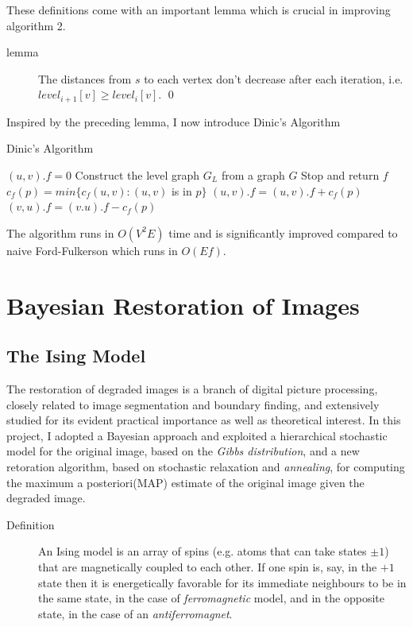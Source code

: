 \documentclass[openany]{memoir}
\begin{document}
These definitions come with an important lemma which is crucial in improving algorithm 2.

\begin{description}
\item[lemma] The distances from $s$ to each vertex don't decrease after each iteration, i.e. $level_{i + 1}[v] \geq level_{i}[v]$. \qed
\end{description}

Inspired by the preceding lemma, I now introduce Dinic's Algorithm

\begin{algorithm}
\caption{Dinic's Algorithm}
\begin{algorithmic}[1]
\STATE $(u,v).f = 0$
\ENDFOR
\STATE Construct the level graph $G_L$ from a graph $G$
\STATE Stop and return $f$
\ENDIF
{}
\STATE $c_f(p) = min\{c_f(u,v) : (u,v)$ is in $p\}$
\STATE $(u,v).f = (u,v).f + c_f(p)$
\ELSE
\STATE $(v,u).f = (v.u).f - c_f(p)$
\ENDIF
\ENDFOR
\ENDWHILE
\end{algorithmic}
\end{algorithm}

The algorithm runs in $O(V^{2}E)$ time and is significantly improved compared to naive Ford-Fulkerson which runs in $O(Ef)$.

\chapter{Bayesian Restoration of Images}
\section{The Ising Model}

The restoration of degraded images is a branch of digital picture processing, closely related to image segmentation and boundary finding, and extensively studied for its evident practical importance as well as theoretical interest. In this project, I adopted a Bayesian approach and exploited a hierarchical stochastic model for the original image, based on the \textit{Gibbs distribution}, and a new retoration algorithm, based on stochastic relaxation and \textit{annealing}, for computing the maximum a posteriori(MAP) estimate of the original image given the degraded image.

\begin{description}
\item[Definition] An Ising model is an array of spins (e.g. atoms that can take states $\pm 1$) that are magnetically coupled to each other. If one spin is, say, in the $+1$ state then it is energetically favorable for its immediate neighbours to be in the same state, in the case of \textit{ferromagnetic} model, and in the opposite state, in the case of an \textit{antiferromagnet}.
\end{description}
\end{document}
